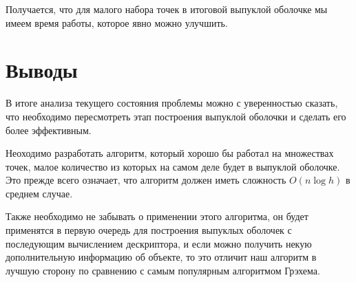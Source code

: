 Получается, что для малого набора точек в итоговой выпуклой оболочке мы имеем время работы, которое явно можно улучшить.

\section{Выводы} \label{subsect1_4}

В итоге анализа текущего состояния проблемы можно с уверенностью сказать, что необходимо пересмотреть этап построения выпуклой оболочки и сделать его более эффективным.

Неоходимо разработать алгоритм, который хорошо бы работал на множествах точек, малое количество из которых на самом деле будет в выпуклой оболочке. Это прежде всего означает, что алгоритм должен иметь сложность $O(n \log h)$ в среднем случае.

Также необходимо не забывать о применении этого алгоритма, он будет применятся в первую очередь для построения выпуклых оболочек с последующим вычислением дескриптора, и если можно получить некую дополнительную информацию об объекте, то это отличит наш алгоритм в лучшую сторону по сравнению с самым популярным алгоритмом Грэхема.

